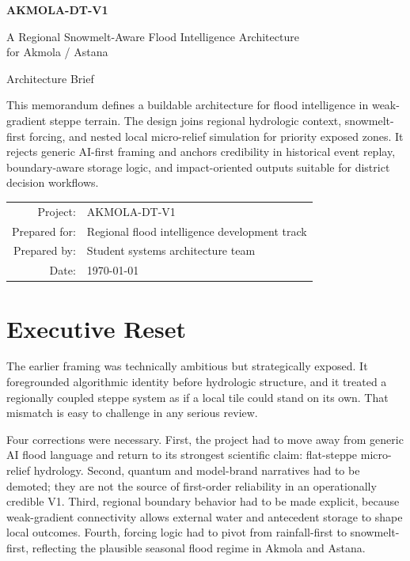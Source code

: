 \documentclass[11pt]{article}
\begin{document}
\begin{titlepage}
  \centering
  \vspace*{2.5cm}
  {\LARGE\bfseries AKMOLA-DT-V1\par}
  \vspace{0.35cm}
  {\Large A Regional Snowmelt-Aware Flood Intelligence Architecture\\for Akmola / Astana\par}
  \vspace{1.2cm}
  {\large Architecture Brief\par}
  \vspace{1.2cm}

  \begin{minipage}{0.88\textwidth}
    \small
    \color{textgray}
    This memorandum defines a buildable architecture for flood intelligence in weak-gradient steppe terrain. The design joins regional hydrologic context, snowmelt-first forcing, and nested local micro-relief simulation for priority exposed zones. It rejects generic AI-first framing and anchors credibility in historical event replay, boundary-aware storage logic, and impact-oriented outputs suitable for district decision workflows.
  \end{minipage}

  \vfill
  \begin{tabular}{rl}
    Project: & AKMOLA-DT-V1 \\
    Prepared for: & Regional flood intelligence development track \\
    Prepared by: & Student systems architecture team \\
    Date: & \today \\
  \end{tabular}
\end{titlepage}

\section{Executive Reset}

The earlier framing was technically ambitious but strategically exposed. It foregrounded algorithmic identity before hydrologic structure, and it treated a regionally coupled steppe system as if a local tile could stand on its own. That mismatch is easy to challenge in any serious review.

Four corrections were necessary. First, the project had to move away from generic AI flood language and return to its strongest scientific claim: flat-steppe micro-relief hydrology. Second, quantum and model-brand narratives had to be demoted; they are not the source of first-order reliability in an operationally credible V1. Third, regional boundary behavior had to be made explicit, because weak-gradient connectivity allows external water and antecedent storage to shape local outcomes. Fourth, forcing logic had to pivot from rainfall-first to snowmelt-first, reflecting the plausible seasonal flood regime in Akmola and Astana.
\end{document}
